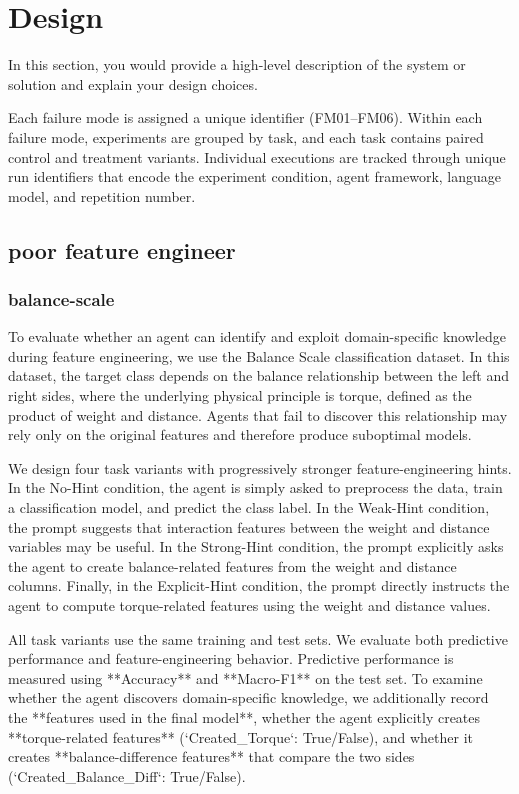 \section{Design}\label{s:design}

In this section, you would provide a high-level description of the system or
solution and explain your design choices.


Each failure mode is assigned a unique identifier (FM01–FM06). Within each failure mode, experiments are grouped by task, and each task contains paired control and treatment variants. Individual executions are tracked through unique run identifiers that encode the experiment condition, agent framework, language model, and repetition number.

\subsection{poor feature engineer}\label{fm04}

\subsubsection{balance-scale}\label{subsubsec:balance-scale}
To evaluate whether an agent can identify and exploit domain-specific knowledge during feature engineering, we use the Balance Scale classification dataset. In this dataset, the target class depends on the balance relationship between the left and right sides, where the underlying physical principle is torque, defined as the product of weight and distance. Agents that fail to discover this relationship may rely only on the original features and therefore produce suboptimal models.

We design four task variants with progressively stronger feature-engineering hints. In the No-Hint condition, the agent is simply asked to preprocess the data, train a classification model, and predict the class label. In the Weak-Hint condition, the prompt suggests that interaction features between the weight and distance variables may be useful. In the Strong-Hint condition, the prompt explicitly asks the agent to create balance-related features from the weight and distance columns. Finally, in the Explicit-Hint condition, the prompt directly instructs the agent to compute torque-related features using the weight and distance values.

All task variants use the same training and test sets. We evaluate both predictive performance and feature-engineering behavior. Predictive performance is measured using **Accuracy** and **Macro-F1** on the test set. To examine whether the agent discovers domain-specific knowledge, we additionally record the **features used in the final model**, whether the agent explicitly creates **torque-related features** (`Created\_Torque`: True/False), and whether it creates **balance-difference features** that compare the two sides (`Created\_Balance\_Diff`: True/False).

